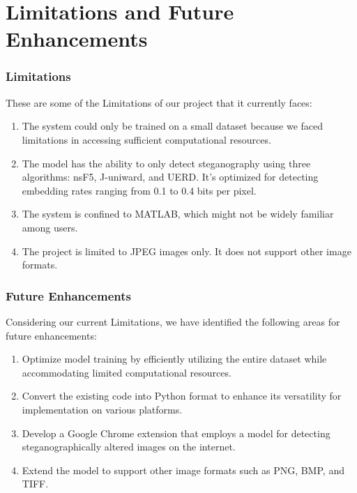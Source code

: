 \chapter{Limitations and Future Enhancements}
\subsection{Limitations}
These are some of the Limitations of our project that it currently faces:
\begin{enumerate}[noitemsep]
    \item The system could only be trained on a small dataset because we faced limitations in accessing sufficient computational resources.
    \item The model has the ability to only detect steganography using three algorithms: nsF5, J-uniward, and UERD. It's optimized for detecting embedding rates ranging from 0.1 to 0.4 bits per pixel.
    \item The system is confined to MATLAB, which might not be widely familiar among users.
    \item The project is limited to JPEG images only. It does not support other image formats.
\end{enumerate}

\subsection{Future Enhancements}
Considering our current Limitations, we have identified the following areas for future enhancements:
\begin{enumerate}[noitemsep]
    \item Optimize model training by efficiently utilizing the entire dataset while accommodating limited computational resources.
    \item Convert the existing code into Python format to enhance its versatility for implementation on various platforms.
    \item Develop a Google Chrome extension that employs a model for detecting steganographically altered images on the internet.
    \item Extend the model to support other image formats such as PNG, BMP, and TIFF.
\end{enumerate}

